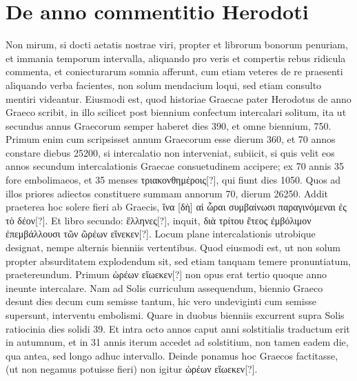 \section{De anno commentitio Herodoti}

Non mirum, si docti aetatis nostrae viri, propter et librorum bonorum
penuriam, et immania temporum intervalla, aliquando
pro veris et compertis rebus ridicula commenta, et coniecturarum
somnia afferunt, cum etiam veteres de re praesenti aliquando
verba facientes, non solum mendacium loqui, sed etiam consulto
mentiri videantur.
Eiusmodi est, quod historiae Graecae pater Herodotus
de anno Graeco scribit, in illo scilicet post biennium confectum intercalari
solitum, ita ut secundus annus Graecorum semper haberet dies
390, et omne biennium, 750.
Primum enim cum scripsisset annum
Graecorum esse dierum 360, et 70 annos constare diebus 25200,
si intercalatio non interveniat, subiicit, si quis velit eos annos secundum
intercalationis Graecae consuetudinem accipere; ex 70 annis 35
fore embolimaeos, et 35 menses \textgreek{τριακονθημέροις[?]},
 qui fiunt dies 1050.
Quos ad illos priores adiectos constituere summam annorum 70, dierum
26250.
Addit praeterea hoc solere fieri ab Graecis,
 \textgreek{ἵνα [δὴ] αἱ ὧραι συμβαίνωσι
παραγινόμεναι ἐς τὸ δέον[?]}.
Et libro secundo: \textgreek{ἕλληνες[?]},
 inquit, \textgreek{διὰ τρίτου
ἔτεος ἐμβόλιμον ἐπεμβάλλουσι τῶν ῶρέων εἵνεκεν[?]}.
Locum plane intercalationis
utrobique designat, nempe alternis bienniis vertentibus.
Quod
eiusmodi est, ut non solum propter absurditatem explodendum sit, sed
etiam tanquam temere pronuntiatum, praetereundum.
Primum
\textgreek{ὡρέων εἵωεκεν[?]}
 non opus erat tertio quoque anno ineunte intercalare.
Nam ad Solis curriculum assequendum, biennio Graeco desunt dies
decum cum semisse tantum, hic vero undeviginti cum semisse supersunt,
interventu embolismi.
Quare in duobus bienniis excurrent supra
Solis ratiocinia dies solidi 39.
Et intra octo annos caput anni solstitialis
traductum erit in autumnum, et in 31 annis iterum accedet ad
solstitium, non tamen eadem die, qua antea, sed longo adhuc intervallo.
Deinde ponamus hoc Graecos factitasse, (ut non negamus potuisse
fieri) non igitur \textgreek{ὡρέων εἵωεκεν[?]}.

